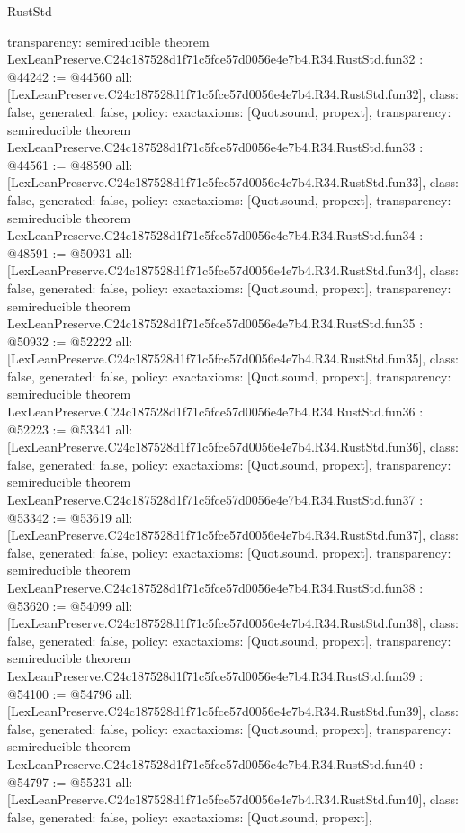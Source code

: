 \begin{lexlean}{RustStd}
\begin{coremodule}
{  transparency: semireducible
}
theorem LexLeanPreserve.C24c187528d1f71c5fce57d0056e4e7b4.R34.RustStd.fun32 : @44242 := @44560 {
  all: [LexLeanPreserve.C24c187528d1f71c5fce57d0056e4e7b4.R34.RustStd.fun32],
  class: false,
  generated: false,
  policy: exact{axioms: [Quot.sound, propext]},
  transparency: semireducible
}
theorem LexLeanPreserve.C24c187528d1f71c5fce57d0056e4e7b4.R34.RustStd.fun33 : @44561 := @48590 {
  all: [LexLeanPreserve.C24c187528d1f71c5fce57d0056e4e7b4.R34.RustStd.fun33],
  class: false,
  generated: false,
  policy: exact{axioms: [Quot.sound, propext]},
  transparency: semireducible
}
theorem LexLeanPreserve.C24c187528d1f71c5fce57d0056e4e7b4.R34.RustStd.fun34 : @48591 := @50931 {
  all: [LexLeanPreserve.C24c187528d1f71c5fce57d0056e4e7b4.R34.RustStd.fun34],
  class: false,
  generated: false,
  policy: exact{axioms: [Quot.sound, propext]},
  transparency: semireducible
}
theorem LexLeanPreserve.C24c187528d1f71c5fce57d0056e4e7b4.R34.RustStd.fun35 : @50932 := @52222 {
  all: [LexLeanPreserve.C24c187528d1f71c5fce57d0056e4e7b4.R34.RustStd.fun35],
  class: false,
  generated: false,
  policy: exact{axioms: [Quot.sound, propext]},
  transparency: semireducible
}
theorem LexLeanPreserve.C24c187528d1f71c5fce57d0056e4e7b4.R34.RustStd.fun36 : @52223 := @53341 {
  all: [LexLeanPreserve.C24c187528d1f71c5fce57d0056e4e7b4.R34.RustStd.fun36],
  class: false,
  generated: false,
  policy: exact{axioms: [Quot.sound, propext]},
  transparency: semireducible
}
theorem LexLeanPreserve.C24c187528d1f71c5fce57d0056e4e7b4.R34.RustStd.fun37 : @53342 := @53619 {
  all: [LexLeanPreserve.C24c187528d1f71c5fce57d0056e4e7b4.R34.RustStd.fun37],
  class: false,
  generated: false,
  policy: exact{axioms: [Quot.sound, propext]},
  transparency: semireducible
}
theorem LexLeanPreserve.C24c187528d1f71c5fce57d0056e4e7b4.R34.RustStd.fun38 : @53620 := @54099 {
  all: [LexLeanPreserve.C24c187528d1f71c5fce57d0056e4e7b4.R34.RustStd.fun38],
  class: false,
  generated: false,
  policy: exact{axioms: [Quot.sound, propext]},
  transparency: semireducible
}
theorem LexLeanPreserve.C24c187528d1f71c5fce57d0056e4e7b4.R34.RustStd.fun39 : @54100 := @54796 {
  all: [LexLeanPreserve.C24c187528d1f71c5fce57d0056e4e7b4.R34.RustStd.fun39],
  class: false,
  generated: false,
  policy: exact{axioms: [Quot.sound, propext]},
  transparency: semireducible
}
theorem LexLeanPreserve.C24c187528d1f71c5fce57d0056e4e7b4.R34.RustStd.fun40 : @54797 := @55231 {
  all: [LexLeanPreserve.C24c187528d1f71c5fce57d0056e4e7b4.R34.RustStd.fun40],
  class: false,
  generated: false,
  policy: exact{axioms: [Quot.sound, propext]},
}
\end{coremodule}
\end{lexlean}
